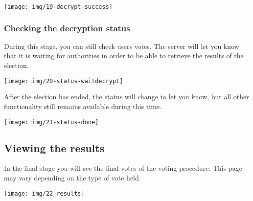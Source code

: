 \documentclass[letterpaper,10pt]{article}
\begin{document}
\texttt{[image: img/19-decrypt-success]}

\subsubsection{Checking the decryption status}

During this stage, you can still check users votes. The server will
let you know that it is waiting for authorities in order to be able
to retrieve the results of the election.

\texttt{[image: img/20-status-waitdecrypt]}

After the election has ended, the status will change to let you
know, but all other functionality still remains available during
this time.

\texttt{[image: img/21-status-done]}

\subsection{Viewing the results}

In the final stage you will see the final votes of the voting
procedure. This page may vary depending on the type of vote held.

\texttt{[image: img/22-results]}
\end{document}
